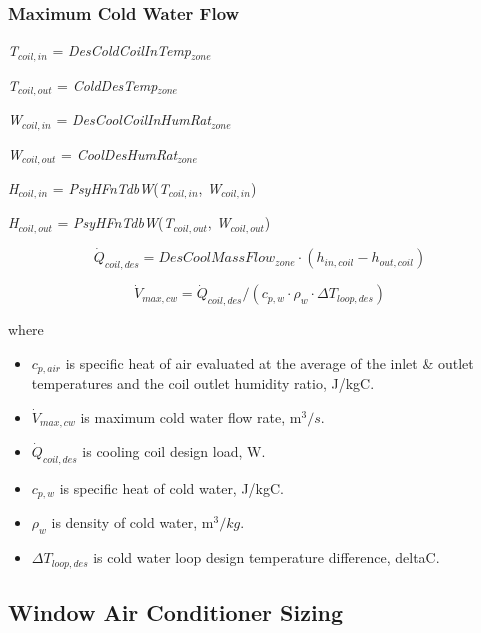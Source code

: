 \subsubsection{Maximum Cold Water Flow}\label{maximum-cold-water-flow}

\emph{T\(_{coil,in}\)} = \emph{DesColdCoilInTemp\(_{zone}\)}

\emph{T\(_{coil,out}\)} = \emph{ColdDesTemp\(_{zone}\)}

\emph{W\(_{coil,in}\)} = \emph{DesCoolCoilInHumRat\(_{zone}\)}

\emph{W\(_{coil,out}\)} = \emph{CoolDesHumRat\(_{zone}\)}

\emph{H\(_{coil,in}\)} = \emph{PsyHFnTdbW}(\emph{T\(_{coil,in}\)}, \emph{W\(_{coil,in}\)})

\emph{H\(_{coil,out}\)} = \emph{PsyHFnTdbW}(\emph{T\(_{coil,out}\)}, \emph{W\(_{coil,out}\)})

\begin{equation}
  \dot{Q}_{coil,des} = DesCoolMassFlow_{zone} \cdot (h_{in,coil} - h_{out,coil})
\end{equation}

\begin{equation}
  \dot{V}_{max,cw} = \dot{Q}_{coil,des} / (c_{p,w} \cdot \rho_w \cdot \Delta T_{loop,des})
\end{equation}

where

\begin{itemize}
\tightlist
\item
  \(c_{p,air}\) is specific heat of air evaluated at the average of the inlet \& outlet temperatures and the coil outlet humidity ratio, J/kgC.
\item
  \(\dot{V}_{max,cw}\) is maximum cold water flow rate, m$^{3}/s$.
\item
  \(\dot{Q}_{coil,des}\) is cooling coil design load, W.
\item
  \(c_{p,w}\) is specific heat of cold water, J/kgC.
\item
  \(\rho_{w}\) is density of cold water, m$^{3}/kg$.
\item
  \(\Delta T_{loop,des}\) is cold water loop design temperature difference, deltaC.
\end{itemize}

\subsection{Window Air Conditioner Sizing}\label{window-air-conditioner-sizing}


